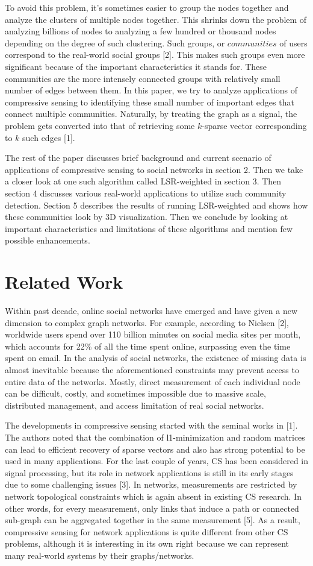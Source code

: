 \documentclass{article}
\begin{document}
To avoid this problem, it's sometimes easier to group the nodes together and analyze the clusters of multiple nodes
together. This shrinks down the problem of analyzing billions of nodes to analyzing a few hundred or thousand nodes
depending on the degree of such clustering. Such groups, or $communities$ of users correspond to the real-world social
groups [2]. This makes such groups even more significant because of the important characteristics it stands for. These
communities are the more intensely connected groups with relatively small number of edges between them. In this paper,
we try to analyze applications of compressive sensing to identifying these small number of important edges that connect
multiple communities. Naturally, by treating the graph as a signal, the problem gets converted into that of retrieving
some $k$-sparse vector corresponding to $k$ such edges [1]. 

The rest of the paper discusses brief background and current scenario of applications of compressive sensing to social
networks in section 2. Then we take a closer look at one such algorithm called LSR-weighted in section 3. Then section 4
discusses various real-world applications to utilize such community detection. Section 5 describes the results of
running LSR-weighted and shows how these communities look by 3D visualization. Then we conclude by looking at important
characteristics and limitations of these algorithms and mention few possible enhancements. 
\section{Related Work}
Within past decade, online social networks have emerged and have given a new dimension to complex graph networks. For
example, according to Nielsen [2], worldwide users spend over 110 billion minutes on social media sites per month, which
accounts for 22\% of all the time spent online, surpassing even the time spent on email. In the analysis of social networks, the existence of missing data is almost inevitable because the aforementioned constraints may prevent access to entire data of the networks. Mostly, direct measurement of each individual node can be difficult, costly, and sometimes impossible due to massive scale, distributed management, and access limitation of real social networks.

The developments in compressive sensing started with the seminal works in [1]. The authors noted that the
combination of l1-minimization and random matrices can lead to efficient recovery of sparse vectors and also has
strong potential to be used in many applications. For the last couple of years, CS has been considered in signal
processing, but its role in network applications is still in its early stages due to some challenging issues [3]. In
networks, measurements are restricted by network topological constraints which is again absent in existing CS research.
In other words, for every measurement, only links that induce a path or connected sub-graph can be aggregated together
in the same measurement [5]. As a result, compressive sensing for network applications is quite different from other CS problems, although it is interesting in its own right because we can represent many real-world systems by their graphs/networks.
\end{document}
